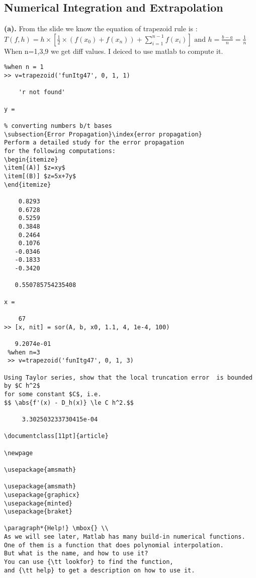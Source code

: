 \subsection{Numerical Integration and Extrapolation}
\textbf{(a).} From the slide we know the equation of trapezoid rule is :\\
$T(f,h)=h\times [\frac{1}{2}\times(f(x_0)+f(x_n))+\sum_{i=1}^{n-1} f(x_i)] \text{ and }h=\frac{b-a}{n}=\frac{1}{n}$ \\When n=1,3,9 we get diff values. I deiced to use matlab to compute it. 
\begin{verbatim}
%when n = 1
>> v=trapezoid('funItg47', 0, 1, 1)

    'r not found'

y =

% converting numbers b/t bases
\subsection{Error Propagation}\index{error propagation}
Perform a detailed study for the error propagation
for the following computations:
\begin{itemize}
\item[(A)] $z=xy$
\item[(B)] $z=5x+7y$
\end{itemize}

    0.8293
    0.6728
    0.5259
    0.3848
    0.2464
    0.1076
   -0.0346
   -0.1833
   -0.3420

   0.550785754235408

x =

    67
>> [x, nit] = sor(A, b, x0, 1.1, 4, 1e-4, 100)

   9.2074e-01
 %when n=3
 >> v=trapezoid('funItg47', 0, 1, 3)

Using Taylor series, show that the local truncation error  is bounded by $C h^2$
for some constant $C$, i.e.
$$ \abs{f'(x) - D_h(x)} \le C h^2.$$

     3.302503233730415e-04

\documentclass[11pt]{article}

\newpage

\usepackage{amsmath}

\usepackage{amsmath}
\usepackage{graphicx}
\usepackage{minted}
\usepackage{braket}

\paragraph*{Help!} \mbox{} \\
As we will see later, Matlab has many build-in numerical functions.
One of them is a function that does polynomial interpolation. 
But what is the name, and how to use it? 
You can use {\tt lookfor} to find the function,
and {\tt help} to get a description on how to use it. 


\end{verbatim}
